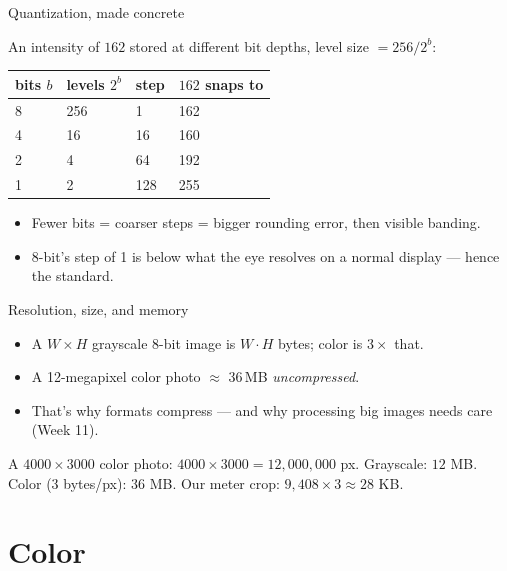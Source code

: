 \documentclass[10pt,aspectratio=169]{beamer}
\begin{document}
\begin{frame}{Quantization, made concrete}
  \begin{mathbox}
    An intensity of \(162\) stored at different bit depths, level size \(= 256/2^{b}\): \\[3pt]
    \begin{tabular}{@{}llll@{}}
      \toprule
      bits \(b\) & levels \(2^b\) & step & \(162\) snaps to \\
      \midrule
      8 & 256 & 1   & 162 \\
      4 & 16  & 16  & 160 \\
      2 & 4   & 64  & 192 \\
      1 & 2   & 128 & 255 \\
      \bottomrule
    \end{tabular}
  \end{mathbox}
  \begin{itemize}
    \item Fewer bits = coarser steps = bigger rounding error, then visible banding.
    \item 8-bit's step of 1 is below what the eye resolves on a normal display — hence the standard.
  \end{itemize}
\end{frame}

\begin{frame}{Resolution, size, and memory}
  \begin{itemize}
    \item A $W\times H$ grayscale 8-bit image is $W\cdot H$ bytes; color is $3\times$ that.
    \item A 12-megapixel color photo $\approx$ 36\,MB \emph{uncompressed}.
    \item That's why formats compress — and why processing big images needs care (Week 11).
  \end{itemize}
  \begin{mathbox}
    A $4000\times3000$ color photo: \(4000 \times 3000 = 12{,}000{,}000\) px.
    Grayscale: \(12\) MB. Color (3 bytes/px): \(36\) MB. Our meter crop: \(9{,}408 \times 3 \approx 28\) KB.
  \end{mathbox}
\end{frame}

\section{Color}
\end{document}
